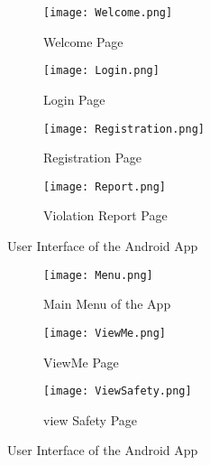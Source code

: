 \begin{figure}[H]
  \begin{subfigure}[b]{0.5\linewidth}
    \centering
    \texttt{[image: Welcome.png]} 
    \caption{Welcome Page} 
    \label{fig7:welcome} 
    \vspace{1ex}
  \end{subfigure}%
  \begin{subfigure}[b]{0.5\linewidth}
    \centering
    \texttt{[image: Login.png]} 
    \caption{Login Page} 
    \label{fig7:login} 
    \vspace{1ex}
  \end{subfigure} 
  \begin{subfigure}[b]{0.5\linewidth}
    \centering
    \texttt{[image: Registration.png]} 
    \caption{Registration Page} 
    \label{fig7:registration} 
  \end{subfigure}%
  \begin{subfigure}[b]{0.5\linewidth}
    \centering
    \texttt{[image: Report.png]} 
    \caption{Violation Report Page} 
    \label{fig7:report} 
  \end{subfigure} 
  \caption{User Interface of the Android App}
  \label{fig7} 
\end{figure}

\begin{figure}[H] 
  \begin{subfigure}[b]{0.5\linewidth}
    \centering
    \texttt{[image: Menu.png]} 
    \caption{Main Menu of the App} 
    \label{fig7:menu} 
    \vspace{4ex}
  \end{subfigure}%
  \begin{subfigure}[b]{0.5\linewidth}
    \centering
    \texttt{[image: ViewMe.png]} 
    \caption{ViewMe Page} 
    \label{fig7:viewme} 
    \vspace{4ex}
  \end{subfigure} 
  \begin{subfigure}[b]{0.5\linewidth}
    \centering
    \texttt{[image: ViewSafety.png]} 
    \caption{view Safety Page} 
    \label{fig7:viewsafety} 
  \end{subfigure}%
  \label{fig7} 
  \caption{User Interface of the Android App}
\end{figure}

